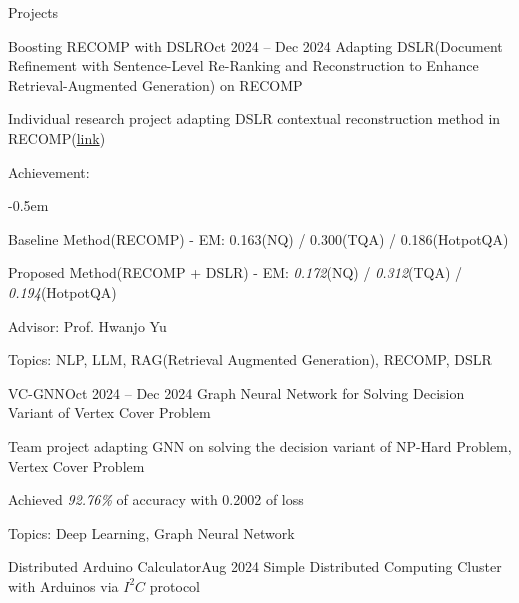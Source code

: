 \documentclass{resume}
\begin{document}
\begin{rSection}{Projects}
    \begin{rSubsection}{Boosting RECOMP with DSLR}{Oct 2024 -- Dec 2024}
        Adapting DSLR(Document Refinement with Sentence-Level Re-Ranking and Reconstruction to Enhance Retrieval-Augmented Generation) on RECOMP

        \item Individual research project adapting DSLR contextual reconstruction method in RECOMP(\href{https://github.com/minsusun/boosting-recomp-with-dslr}{link})

        \item Achievement:
        \vspace{-0.5em}
        \begin{list}{--}{\setlength{\rightmargin}{1.5em}}
            \itemsep -0.5em

            \item Baseline Method(RECOMP) - EM: 0.163(NQ) / 0.300(TQA) / 0.186(HotpotQA)

            \item Proposed Method(RECOMP + DSLR) - EM: \emph{0.172}(NQ) / \emph{0.312}(TQA) / \emph{0.194}(HotpotQA)
        \end{list}

        \item Advisor: Prof. Hwanjo Yu

        \item Topics: NLP, LLM, RAG(Retrieval Augmented Generation), RECOMP, DSLR
    \end{rSubsection}

    \begin{rSubsection}{VC-GNN}{Oct 2024 -- Dec 2024}
        Graph Neural Network for Solving Decision Variant of Vertex Cover Problem

        \item Team project adapting GNN on solving the decision variant of NP-Hard Problem, Vertex Cover Problem

        \item Achieved \emph{92.76\%} of accuracy with 0.2002 of loss

        \item Topics: Deep Learning, Graph Neural Network
    \end{rSubsection}


    \begin{rSubsection}{Distributed Arduino Calculator}{Aug 2024}
        Simple Distributed Computing Cluster with Arduinos via $I^2C$ protocol


\end{rSubsection}
\end{rSection}
\end{document}
